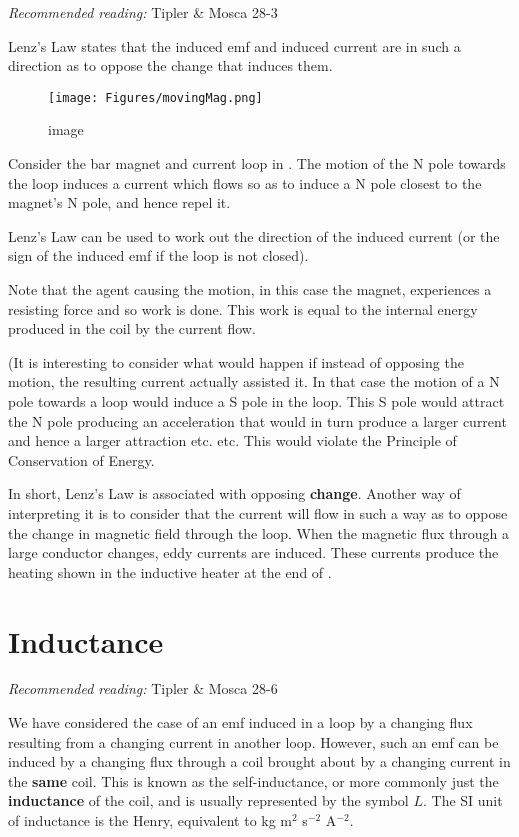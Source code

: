 \documentclass[
]{book}
\theoremstyle{definition}
\theoremstyle{definition}
\theoremstyle{definition}
\theoremstyle{definition}
\theoremstyle{remark}
\begin{document}
\emph{Recommended reading:} Tipler \& Mosca 28-3

Lenz's Law states that the induced emf and induced current are in such a
direction as to oppose the change that induces them.

\begin{figure}
\centering
\texttt{[image: Figures/movingMag.png]}
\caption{image}
\end{figure}

Consider the bar magnet and current loop in . The motion of the N pole
towards the loop induces a current which flows so as to induce a N pole
closest to the magnet's N pole, and hence repel it.

Lenz's Law can be used to work out the direction of the induced current
(or the sign of the induced emf if the loop is not closed).

Note that the agent causing the motion, in this case the magnet,
experiences a resisting force and so work is done. This work is equal to
the internal energy produced in the coil by the current flow.

(It is interesting to consider what would happen if instead of opposing
the motion, the resulting current actually assisted it. In that case the
motion of a N pole towards a loop would induce a S pole in the loop.
This S pole would attract the N pole producing an acceleration that
would in turn produce a larger current and hence a larger attraction
etc. etc. This would violate the Principle of Conservation of Energy.

In short, Lenz's Law is associated with opposing \textbf{change}. Another way
of interpreting it is to consider that the current will flow in such a
way as to oppose the change in magnetic field through the loop. When the
magnetic flux through a large conductor changes, eddy currents are
induced. These currents produce the heating shown in the inductive
heater at the end of .

\hypertarget{inductance}{%
\section{Inductance}\label{inductance}}

\emph{Recommended reading:} Tipler \& Mosca 28-6

We have considered the case of an emf induced in a loop by a changing
flux resulting from a changing current in another loop. However, such an
emf can be induced by a changing flux through a coil brought about by a
changing current in the \textbf{same} coil. This is known as the
self-inductance, or more commonly just the \textbf{inductance} of the coil,
and is usually represented by the symbol \(L\). The SI unit of inductance
is the Henry, equivalent to kg m\(^2\) s\(^{-2}\) A\(^{-2}\).
\end{document}
